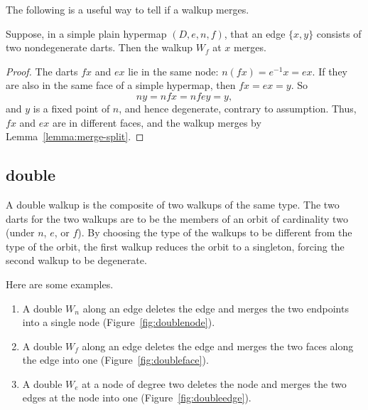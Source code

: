 \figILWHXTE %


The following is a useful way to tell if a walkup merges.


\begin{lemma}\label{lemma:ng-merge}  
\hspace{-10pt}
Suppose, in a simple plain hypermap $(D,e,n,f)$, that an edge $\{x,y\}$ consists
of two nondegenerate darts.  Then the walkup $W_f$ 
at $x$ merges.
\end{lemma}
%

\begin{proof}
The darts $f x$ and $e x$ lie in the same node: $n (f x) = e^{-1} x
= e x$. If they are also in the same face of a simple hypermap, then
$f x = e x = y$. So
\[ n y = n f x = n f e y = y,\]  and $y$
is a fixed point of $n$, and hence degenerate, contrary to assumption.
Thus, $f x$ and $e x$ are in different faces, and the walkup merges by
Lemma~\ref{lemma:merge-split}.
\end{proof}


\subsection{double}
%

A double walkup is the composite of two walkups of the same type.  The
two darts for the two walkups are to be the members of an orbit of
cardinality two (under $n$, $e$, or $f$).
By choosing the type of the walkups to be different from the type of
the orbit, the first walkup reduces the orbit to a singleton, forcing
the second walkup to be degenerate.

Here are some examples.
\begin{enumerate}\wasitemize 
\item A double $W_n$ along an edge deletes the edge and merges the two
  endpoints into a single node (Figure~\ref{fig:doublenode}).
\item A double $W_f$ along an edge deletes the edge and merges the two
  faces along the edge into one (Figure~\ref{fig:doubleface}).
\item A double $W_e$ at a node of degree two deletes the node and
  merges the two edges at the node into one
  (Figure~\ref{fig:doubleedge}).
\end{enumerate}\wasitemize 


